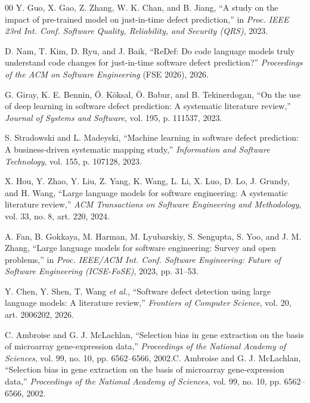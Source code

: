 \documentclass[conference,a4paper]{IEEEtran}
\newif\ifmarcarcambios
\newcommand{\cambio}[1]{\ifmarcarcambios\ifvmode\leavevmode\fi{\color{azulcambio}#1}\else#1\fi}
\begin{document}
\begin{thebibliography}{00}
 Y. Guo, X. Gao, Z. Zhang, W. K. Chan, and B. Jiang, ``A study on the impact of pre-trained model on just-in-time defect prediction,'' in \textit{Proc. IEEE 23rd Int. Conf. Software Quality, Reliability, and Security (QRS)}, 2023.   %

 D. Nam, T. Kim, D. Ryu, and J. Baik, ``ReDef: Do code language models truly understand code changes for just-in-time software defect prediction?'' \textit{Proceedings of the ACM on Software Engineering} (FSE 2026), 2026.   %

 G. Giray, K. E. Bennin, \"O. K\"oksal, \"O. Babur, and B. Tekinerdogan, ``On the use of deep learning in software defect prediction: A systematic literature review,'' \textit{Journal of Systems and Software}, vol. 195, p. 111537, 2023.

 S. Stradowski and L. Madeyski, ``Machine learning in software defect prediction: A business-driven systematic mapping study,'' \textit{Information and Software Technology}, vol. 155, p. 107128, 2023.

 X. Hou, Y. Zhao, Y. Liu, Z. Yang, K. Wang, L. Li, X. Luo, D. Lo, J. Grundy, and H. Wang, ``Large language models for software engineering: A systematic literature review,'' \textit{ACM Transactions on Software Engineering and Methodology}, vol. 33, no. 8, art. 220, 2024.

 A. Fan, B. Gokkaya, M. Harman, M. Lyubarskiy, S. Sengupta, S. Yoo, and J. M. Zhang, ``Large language models for software engineering: Survey and open problems,'' in \textit{Proc. IEEE/ACM Int. Conf. Software Engineering: Future of Software Engineering (ICSE-FoSE)}, 2023, pp. 31--53.

 Y. Chen, Y. Shen, T. Wang \textit{et al.}, ``Software defect detection using large language models: A literature review,'' \textit{Frontiers of Computer Science}, vol. 20, art. 2006202, 2026.   %

 \cambio{C. Ambroise and G. J. McLachlan, ``Selection bias in gene extraction on the basis of microarray gene-expression data,'' \textit{Proceedings of the National Academy of Sciences}, vol. 99, no. 10, pp. 6562--6566, 2002.}


\end{thebibliography}
\end{document}
